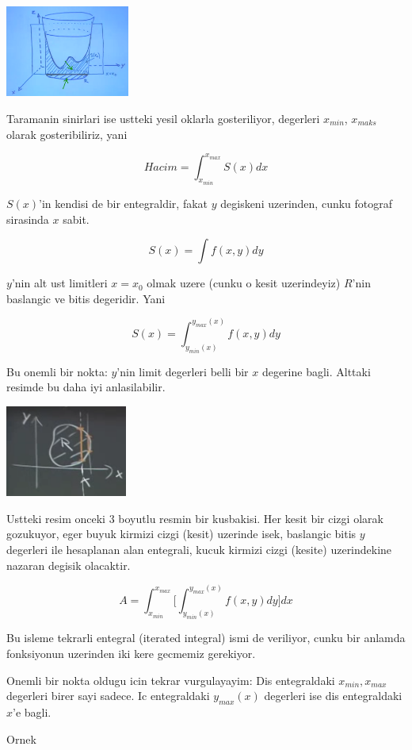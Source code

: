 \documentclass[12pt,fleqn]{article}\usepackage{../common}
\begin{document}
\includegraphics[height=3cm]{16_6.png}

Taramanin sinirlari ise ustteki yesil oklarla gosteriliyor, degerleri
$x_{min}$, $x_{maks}$ olarak gosteribiliriz, yani

\[ Hacim = \int_{x_{min}}^{x_{max}} S(x) dx \]

$S(x)$'in kendisi de bir entegraldir, fakat $y$ degiskeni uzerinden, cunku
fotograf sirasinda $x$ sabit. 

\[ S(x) = \int f(x,y) dy \]

$y$'nin alt ust limitleri $x=x_0$ olmak uzere (cunku o kesit uzerindeyiz)
$R$'nin baslangic ve bitis degeridir. Yani

\[ S(x) = \int_{y_{min}(x)}^{y_{max}(x)} f(x,y) dy \]

Bu onemli bir nokta: $y$'nin limit degerleri belli bir $x$ degerine
bagli. Alttaki resimde bu daha iyi anlasilabilir. 

\includegraphics[height=3cm]{16_7.png}

Ustteki resim onceki 3 boyutlu resmin bir kusbakisi. Her kesit bir cizgi
olarak gozukuyor, eger buyuk kirmizi cizgi (kesit) uzerinde isek, baslangic
bitis $y$ degerleri ile hesaplanan alan entegrali, kucuk kirmizi cizgi
(kesite) uzerindekine nazaran degisik olacaktir.

\[ A = \int_{x_{min}}^{x_{max}} 
\bigg[ 
\int_{y_{min}(x)}^{y_{max}(x)} f(x,y) dy 
\bigg] dx
 \]


Bu isleme tekrarli entegral (iterated integral) ismi de veriliyor, cunku
bir anlamda fonksiyonun uzerinden iki kere gecmemiz gerekiyor. 

Onemli bir nokta oldugu icin tekrar vurgulayayim: Dis entegraldaki
$x_{min}, x_{max}$ degerleri birer sayi sadece. Ic entegraldaki
$y_{max}(x)$ degerleri ise dis entegraldaki $x$'e bagli. 

Ornek
\end{document}
